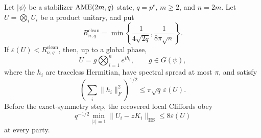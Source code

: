 \begin{theorem}
\label{thm:cleaning-global-rounding}
Let \(\lvert\psi\rangle\) be a stabilizer \(\mathrm{AME}(2m,q)\) state,
\(q=p^e\), \(m\geq2\), and \(n=2m\).  Let
\(U=\bigotimes_iU_i\) be a product unitary, and put
\[
 R^{\mathrm{clean}}_{n,q}=\min\left\{
  \frac1{4\sqrt{2q}},\frac1{8\pi\sqrt n}
 \right\}.                                           \tag{6.3}
\]
If \(\varepsilon(U)<R^{\mathrm{clean}}_{n,q}\), then, up to a global
phase,
\[
 U=g\bigotimes_{i=1}^n e^{ih_i},\qquad g\in G(\psi),
\]
where the \(h_i\) are traceless Hermitian, have spectral spread at most
\(\pi\), and satisfy
\[
 \left(\sum_i\lVert h_i\rVert_F^2\right)^{1/2}
 \leq\pi\sqrt q\,\varepsilon(U).                     \tag{6.4}
\]
Before the exact-symmetry step, the recovered local Cliffords obey
\[
 q^{-1/2}\min_{|z|=1}\lVert U_i-zK_i\rVert_{\mathrm{HS}}
 \leq8\varepsilon(U)                                 \tag{6.5}
\]
at every party.
\end{theorem}

